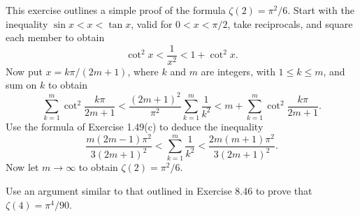 \begin{problembox}
This exercise outlines a simple proof of the formula \(\zeta(2) = \pi^2/6\). Start with the inequality \(\sin x < x < \tan x\), valid for \(0 < x < \pi/2\), take reciprocals, and square each member to obtain
\[\cot^2 x < \frac{1}{x^2} < 1 + \cot^2 x.\]
Now put \(x = k\pi/(2m + 1)\), where \(k\) and \(m\) are integers, with \(1 \leq k \leq m\), and sum on \(k\) to obtain
\[\sum_{k=1}^{m} \cot^2 \frac{k\pi}{2m + 1} < \frac{(2m + 1)^2}{\pi^2} \sum_{k=1}^{m} \frac{1}{k^2} < m + \sum_{k=1}^{m} \cot^2 \frac{k\pi}{2m + 1}.\]
Use the formula of Exercise 1.49(c) to deduce the inequality
\[\frac{m(2m - 1)\pi^2}{3(2m + 1)^2} < \sum_{k=1}^m \frac{1}{k^2} < \frac{2m(m + 1)\pi^2}{3(2m + 1)^2}.\]
Now let \(m \to \infty\) to obtain \(\zeta(2) = \pi^2/6\).
\end{problembox}



\begin{problembox}
Use an argument similar to that outlined in Exercise 8.46 to prove that \(\zeta(4) = \pi^4/90\).
\end{problembox}